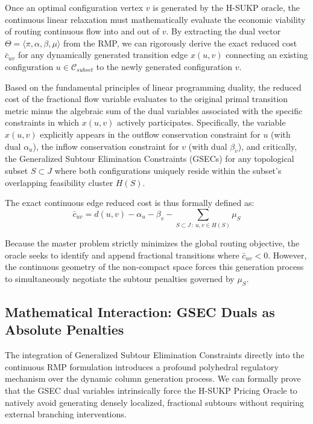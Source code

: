 \documentclass[11pt, a4paper]{book}
\begin{document}
	Once an optimal configuration vertex $v$ is generated by the H-SUKP oracle, the continuous linear relaxation must mathematically evaluate the economic viability of routing continuous flow into and out of $v$. By extracting the dual vector $\Theta = \langle \pi, \alpha, \beta, \mu \rangle$ from the RMP, we can rigorously derive the exact reduced cost $\bar{c}_{uv}$ for any dynamically generated transition edge $x(u, v)$ connecting an existing configuration $u \in \mathcal{C}_{subset}$ to the newly generated configuration $v$.
	
	Based on the fundamental principles of linear programming duality, the reduced cost of the fractional flow variable evaluates to the original primal transition metric minus the algebraic sum of the dual variables associated with the specific constraints in which $x(u, v)$ actively participates. Specifically, the variable $x(u, v)$ explicitly appears in the outflow conservation constraint for $u$ (with dual $\alpha_u$), the inflow conservation constraint for $v$ (with dual $\beta_v$), and critically, the Generalized Subtour Elimination Constraints (GSECs) for any topological subset $S \subset J$ where both configurations uniquely reside within the subset's overlapping feasibility cluster $H(S)$.
	
	The exact continuous edge reduced cost is thus formally defined as:
	\begin{equation}
		\bar{c}_{uv} = d(u, v) - \alpha_u - \beta_v - \sum_{S \subset J \,:\, u, v \in H(S)} \mu_S
	\end{equation}
	
	Because the master problem strictly minimizes the global routing objective, the oracle seeks to identify and append fractional transitions where $\bar{c}_{uv} < 0$. However, the continuous geometry of the non-compact space forces this generation process to simultaneously negotiate the subtour penalties governed by $\mu_S$.
	
	\subsection{Mathematical Interaction: GSEC Duals as Absolute Penalties}
	
	The integration of Generalized Subtour Elimination Constraints directly into the continuous RMP formulation introduces a profound polyhedral regulatory mechanism over the dynamic column generation process. We can formally prove that the GSEC dual variables intrinsically force the H-SUKP Pricing Oracle to natively avoid generating densely localized, fractional subtours without requiring external branching interventions.
	
\end{document}
